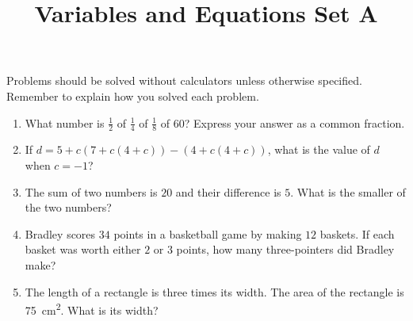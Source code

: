 \documentclass{article}
\title{Variables and Equations Set A}
\author{}
\date{}
\begin{document}
    \maketitle
    \noindent Problems should be solved without calculators unless otherwise
    specified. Remember to explain how you solved each problem.
    \begin{enumerate}
        \item What number is $\frac{1}{2}$ of $\frac{1}{4}$ of $\frac{1}{8}$ of
        $60$? Express your answer as a common fraction.
        \vspace{3cm}
        \item If $d = 5 + c(7 + c(4 + c)) - (4 + c(4 + c))$, what is the value
        of $d$ when $c = -1$?
        \vspace{3cm}
        \item The sum of two numbers is $20$ and their difference is $5$. What
        is the smaller of the two numbers?
        \vspace{3cm}
        \item Bradley scores $34$ points in a basketball game by making $12$
        baskets. If each basket was worth either $2$ or $3$ points, how many
        three-pointers did Bradley make?
        \vspace{3cm}
        \item The length of a rectangle is three times its width. The area of
        the rectangle is \SI{75}{\cm\squared}. What is its width?
        \vspace{3cm}
    \end{enumerate}
\end{document}
